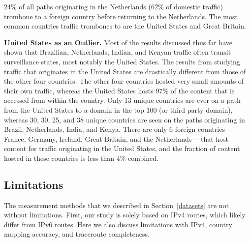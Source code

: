 

24\% of all paths originating in the Netherlands (62\% of domestic traffic) trombone to a foreign country before returning to the Netherlands. The most common countries traffic trombones to are the United States and Great Britain.  %

{\bf United States as an Outlier.}
Most of the results discussed thus far have shown that Brazilian, Netherlands, Indian, and Kenyan traffic often transit surveillance states, most notably the United States.  The results from studying traffic that originates in the United States are drastically different from those of the other four countries.  The other four countries hosted very small amounts of their own traffic, whereas the United States hosts 97\% of the content that is accessed from within the country.  Only 13 unique countries are ever on a path from the United States to a domain in the top 100 (or third party domain), whereas 30, 30, 25, and 38 unique countries are seen on the paths originating in Brazil, Netherlands, India, and Kenya.  There are only 6 foreign countries---France, Germany, Ireland, Great Britain, and the Netherlands----that host content for traffic originating in the United States, and the fraction of content hosted in these countries is less than 4\% combined.

\subsection{Limitations}
The measurement methods that we described in Section~\ref{datasets} are not without limitations.  First, our study is solely based on IPv4 routes, which likely differ from IPv6 routes.  Here we also discuss limitations with IPv4, country mapping accuracy, and traceroute completeness.

